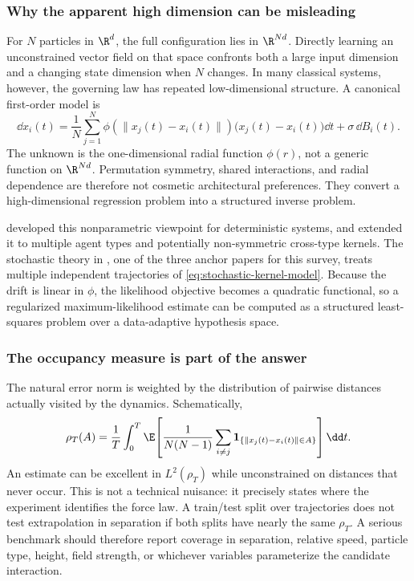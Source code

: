 \subsubsection{Why the apparent high dimension can be misleading}

For \(N\) particles in \(\R^d\), the full configuration lies in \(\R^{Nd}\). Directly learning an unconstrained vector field on that space confronts both a large input dimension and a changing state dimension when \(N\) changes. In many classical systems, however, the governing law has repeated low-dimensional structure. A canonical first-order model is
\begin{equation}
\dd x_i(t)
=
\frac{1}{N}\sum_{j=1}^{N}
\phi\!\left(\lVert x_j(t)-x_i(t)\rVert\right)
\bigl(x_j(t)-x_i(t)\bigr)\dd t
+\sigma\,\dd B_i(t).
\label{eq:stochastic-kernel-model}
\end{equation}
The unknown is the one-dimensional radial function \(\phi(r)\), not a generic function on \(\R^{Nd}\). Permutation symmetry, shared interactions, and radial dependence are therefore not cosmetic architectural preferences. They convert a high-dimensional regression problem into a structured inverse problem.

\citet{lu2019interactionlaws} developed this nonparametric viewpoint for deterministic systems, and \citet{lu2021heterogeneous} extended it to multiple agent types and potentially non-symmetric cross-type kernels. The stochastic theory in \citet{lu2022stochasticinteractions}, one of the three anchor papers for this survey, treats multiple independent trajectories of \cref{eq:stochastic-kernel-model}. Because the drift is linear in \(\phi\), the likelihood objective becomes a quadratic functional, so a regularized maximum-likelihood estimate can be computed as a structured least-squares problem over a data-adaptive hypothesis space.

\subsubsection{The occupancy measure is part of the answer}

The natural error norm is weighted by the distribution of pairwise distances actually visited by the dynamics. Schematically,
\begin{equation}
\rho_T(A)
=
\frac{1}{T}\int_0^T
\E\!\left[
\frac{1}{N(N-1)}
\sum_{i\ne j}
\mathbf 1_{\{\lVert x_j(t)-x_i(t)\rVert\in A\}}
\right]\dd t .
\label{eq:occupancy-measure}
\end{equation}
An estimate can be excellent in \(L^2(\rho_T)\) while unconstrained on distances that never occur. This is not a technical nuisance: it precisely states where the experiment identifies the force law. A train/test split over trajectories does not test extrapolation in separation if both splits have nearly the same \(\rho_T\). A serious benchmark should therefore report coverage in separation, relative speed, particle type, height, field strength, or whichever variables parameterize the candidate interaction.

